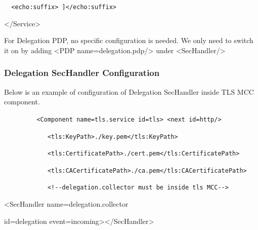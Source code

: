 \documentclass{article}
\begin{document}
{\upshape\color{black}
\foreignlanguage{spanish}{\texttt{\ \ }}\foreignlanguage{spanish}{\texttt{{\textless}echo:suffix{\textgreater}
]{\textless}/echo:suffix{\textgreater}}}}

{\ttfamily\color{black}
{\textless}/Service{\textgreater}}

{\upshape\color{black}
For Delegation PDP, no specific configuration is needed. We only need to
switch it on by adding {\textless}PDP
name={\textquotedbl}delegation.pdp{\textquotedbl}/{\textgreater} under
{\textless}SecHandler/{\textgreater}}

\subsubsection[Delegation SecHandler Configuration]{Delegation
SecHandler Configuration}
\label{bkm:RefSecdelegsechandleconfig}{\upshape\color{black}
Below is an example of configuration of Delegation SecHandler inside TLS
MCC component.}

{\upshape\color{black}
\texttt{\ \ \ \ \ \ \ \ \ {\textless}Component
name={\textquotedbl}tls.service{\textquotedbl}
id={\textquotedbl}tls{\textquotedbl}{\textgreater} {\textless}next
id={\textquotedbl}http{\textquotedbl}/{\textgreater}}}

{\upshape\color{black}
\texttt{\ \ \ \ \ \ \ \ \ \ \ \ {\textless}tls:KeyPath{\textgreater}./key.pem{\textless}/tls:KeyPath{\textgreater}}}

{\upshape\color{black}
\texttt{\ \ \ \ \ \ \ \ \ \ \ \ {\textless}tls:CertificatePath{\textgreater}./cert.pem{\textless}/tls:CertificatePath{\textgreater}}}

{\upshape\color{black}
\texttt{\ \ \ \ \ \ \ \ \ \ \ \ {\textless}tls:CACertificatePath{\textgreater}./ca.pem{\textless}/tls:CACertificatePath{\textgreater}}}

{\upshape\color{black}
\texttt{\ \ \ \ \ \ \ \ \ \ \ \ {\textless}!-{}-delegation.collector
must be inside tls MCC-{}-{\textgreater}}}

{\ttfamily\color{black}
{\textless}SecHandler
name={\textquotedbl}delegation.collector{\textquotedbl} }

{\ttfamily\color{black}
id={\textquotedbl}delegation{\textquotedbl}
event={\textquotedbl}incoming{\textquotedbl}{\textgreater}{\textless}/SecHandler{\textgreater}}
\end{document}
